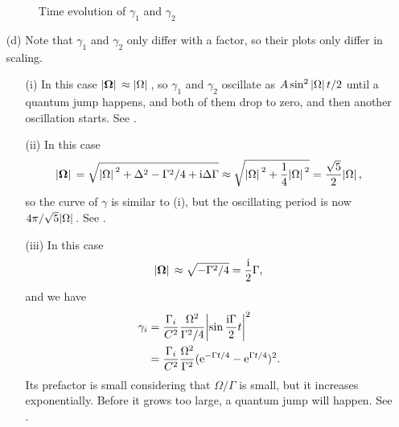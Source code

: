 \documentclass[hyperref, a4paper]{article}
\newcommand*{\ii}{\mathrm{i}}
\newcommand*{\ee}{\mathrm{e}}
\begin{document}
\begin{itemize}
\begin{figure}
    \centering
    \begin{subfigure}{0.45\textwidth}
        \centering
        
        \label{fig:gamma-1}
    \end{subfigure}
    \quad
    \begin{subfigure}{0.45\textwidth}
        \centering
        
        \label{fig:gamma-2}
    \end{subfigure}
    \begin{subfigure}{0.45\textwidth}
        \centering
        
        \label{fig:gamma-3}
    \end{subfigure}
    \caption{Time evolution of $\gamma_1$ and $\gamma_2$}
    \label{fig:gammas}
\end{figure}

\item[(d)] Note that $\gamma_1$ and $\gamma_2$ only differ with a factor, so their plots only differ in scaling.
\begin{itemize}
    \item[(i)] In this case $\abs*{\vb*{\Omega}} \approx \abs*{\Omega}$, so $\gamma_1$ and $\gamma_2$ oscillate as
    $A \sin^2 \abs*{\Omega} t / 2$ until a quantum jump happens, and both of them drop to zero, and then another 
    oscillation starts. See .
    \item[(ii)] In this case 
    \[
        \abs*{\vb*{\Omega}} = \sqrt{\abs*{\Omega}^2 + \Delta^2 - \Gamma^2 / 4 + \ii \Delta \Gamma}
        \approx \sqrt{\abs*{\Omega}^2 + \frac{1}{4} \abs*{\Omega}^2} = \frac{\sqrt{5}}{2} \abs*{\Omega},
    \] 
    so the curve of $\gamma$ is similar to (i), but the oscillating period is now $4 \pi / \sqrt{5} \abs*{\Omega}$. See .
    \item[(iii)] In this case 
    \[
        \abs*{\vb*{\Omega}} \approx \sqrt{- \Gamma^2 / 4} = \frac{\ii}{2} \Gamma,
    \] 
    and we have 
    \[
        \begin{aligned}
            \gamma_i &= \frac{\Gamma_i}{{C}^2} \frac{\Omega^2}{\Gamma^2 / 4} \abs{\sin \frac{\ii \Gamma}{2} t}^2 \\
            &= \frac{\Gamma_i}{{C}^2} \frac{ \Omega^2}{\Gamma^2 } (\ee^{- \Gamma t / 4} - \ee^{\Gamma t / 4})^2.
        \end{aligned}
    \]
    Its prefactor is small considering that $\Omega / \Gamma$ is small, but it increases exponentially. Before it 
    grows too large, a quantum jump will happen. See .
\end{itemize}

\end{itemize}
\end{document}
